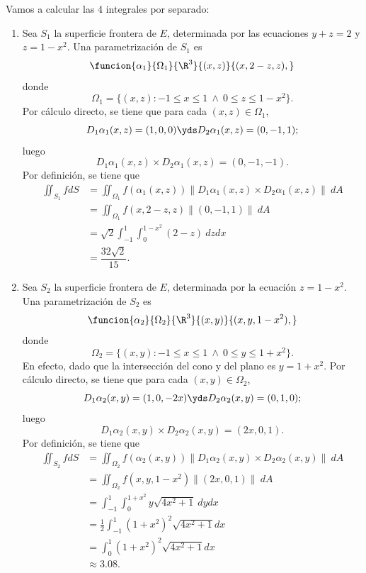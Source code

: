 \documentclass[a4,11pt]{aleph-examen}
\begin{document}
\begin{preguntas}
\begin{respuesta}
\begin{respuesta}
\begin{respuesta}
\begin{enumerate}
\begin{respuesta}
    Vamos a calcular las 4 integrales por separado:
    \begin{enumerate}
        \item Sea $S_1$ la superficie frontera de $E$, determinada por las ecuaciones $y+z=2$ y $z=1-x^2$. Una parametrización de $S_1$ es
        \[
            \funcion{\alpha_1}{\Omega_1}{\R^3}{(x,z)}{(x,2-z,z),}
        \]
        donde 
        \[
            \Omega_1=\{(x,z): -1\leq x\leq 1\ \wedge\ 0\leq z\leq 1-x^2 \}.
        \]
        Por cálculo directo, se tiene que para cada $(x,z)\in\Omega_1$,
        \[
            D_1\alpha_1(x,z)=(1,0,0)
            \yds 
            D_2\alpha_1(x,z)=(0,-1,1);
        \]
        luego
        \[
            D_1\alpha_1(x,z)\times D_2\alpha_1(x,z)
            =(0,-1,-1).
        \]
        Por definición, se tiene que
        \begin{align*}
            \iint_{S_1} f dS
            &= \iint_{\Omega_1} f(\alpha_1(x,z)) \|D_1\alpha_1(x,z)\times D_2\alpha_1(x,z)\| \ dA\\
            &= \iint_{\Omega_1} f(x,2-z,z) \|(0,-1,1)\| \ dA\\
            &= \sqrt 2\int_{-1}^1 \int_0^{1-x^2} (2-z) \ dz dx\\
            &= \dfrac{32\sqrt 2}{15}.
        \end{align*}
        
        \item Sea $S_2$ la superficie frontera de $E$, determinada por la ecuación $z=1-x^2$. Una parametrización de $S_2$ es
        \[
            \funcion{\alpha_2}{\Omega_2}{\R^3}{(x,y)}{(x,y,1-x^2),}
        \]
        donde 
        \[
            \Omega_2=\{(x,y): -1\leq x\leq 1 \ \wedge \ 0\leq y\leq 1+x^2\}.
        \]
        En efecto, dado que la intersección del cono y del plano es $y=1+x^2$. Por cálculo directo, se tiene que para cada $(x,y)\in\Omega_2$,
        \[
            D_1\alpha_2(x,y)=(1,0,-2x)
            \yds 
            D_2\alpha_2(x,y)=(0,1,0);
        \]
        luego
        \[
            D_1\alpha_2(x,y)\times D_2\alpha_2(x,y)
            =(2x,0,1).
        \]
        Por definición, se tiene que
        \begin{align*}
            \iint_{S_2} f dS
            &= \iint_{\Omega_2} f(\alpha_2(x,y)) \|D_1\alpha_2(x,y)\times D_2\alpha_2(x,y)\| \ dA\\
            &= \iint_{\Omega_2} f(x,y,1-x^2) \|(2x,0,1)\| \ dA\\
            &= \int_{-1}^1 \int_0^{1+x^2} y \sqrt{4x^2+1} \ dy dx\\
            &= \frac{1}{2}\int_{-1}^1 (1+x^2)^2\sqrt{4x^2+1} dx\\
            &= \int_{0}^1 (1+x^2)^2\sqrt{4x^2+1} dx\\
            &\approx 3.08.
        \end{align*}
        

\end{enumerate}
\end{respuesta}
\end{enumerate}
\end{respuesta}
\end{respuesta}
\end{respuesta}
\end{preguntas}
\end{document}
